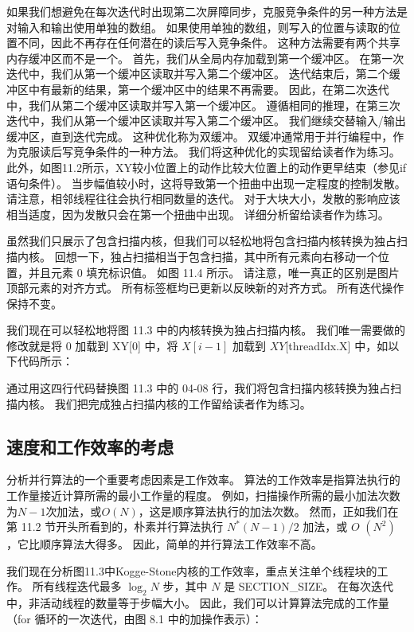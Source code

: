 如果我们想避免在每次迭代时出现第二次屏障同步，克服竞争条件的另一种方法是对输入和输出使用单独的数组。 如果使用单独的数组，则写入的位置与读取的位置不同，因此不再存在任何潜在的读后写入竞争条件。 这种方法需要有两个共享内存缓冲区而不是一个。 首先，我们从全局内存加载到第一个缓冲区。 在第一次迭代中，我们从第一个缓冲区读取并写入第二个缓冲区。 迭代结束后，第二个缓冲区中有最新的结果，第一个缓冲区中的结果不再需要。 因此，在第二次迭代中，我们从第二个缓冲区读取并写入第一个缓冲区。 遵循相同的推理，在第三次迭代中，我们从第一个缓冲区读取并写入第二个缓冲区。 我们继续交替输入/输出缓冲区，直到迭代完成。 这种优化称为双缓冲。 双缓冲通常用于并行编程中，作为克服读后写竞争条件的一种方法。 我们将这种优化的实现留给读者作为练习。 此外，如图11.2所示，$\mathrm{XY}$较小位置上的动作比较大位置上的动作更早结束（参见if语句条件）。 当步幅值较小时，这将导致第一个扭曲中出现一定程度的控制发散。 请注意，相邻线程往往会执行相同数量的迭代。 对于大块大小，发散的影响应该相当适度，因为发散只会在第一个扭曲中出现。 详细分析留给读者作为练习。

虽然我们只展示了包含扫描内核，但我们可以轻松地将包含扫描内核转换为独占扫描内核。 回想一下，独占扫描相当于包含扫描，其中所有元素向右移动一个位置，并且元素 0 填充标识值。 如图 11.4 所示。 请注意，唯一真正的区别是图片顶部元素的对齐方式。 所有标签框均已更新以反映新的对齐方式。 所有迭代操作保持不变。

我们现在可以轻松地将图 11.3 中的内核转换为独占扫描内核。 我们唯一需要做的修改就是将 0 加载到 XY[0] 中，将 $X[i-1]$ 加载到 $XY[$threadIdx.X] 中，如以下代码所示：

通过用这四行代码替换图 11.3 中的 04-08 行，我们将包含扫描内核转换为独占扫描内核。 我们把完成独占扫描内核的工作留给读者作为练习。

\subsection{速度和工作效率的考虑}
分析并行算法的一个重要考虑因素是工作效率。 算法的工作效率是指算法执行的工作量接近计算所需的最小工作量的程度。 例如，扫描操作所需的最小加法次数为$N-1$次加法，或$O(N)$，这是顺序算法执行的加法次数。 然而，正如我们在第 11.2 节开头所看到的，朴素并行算法执行 $N^{*}(N-1) / 2$ 加法，或 $O$ $\left(N^{2}\right)$ ，它比顺序算法大得多。 因此，简单的并行算法工作效率不高。

我们现在分析图11.3中Kogge-Stone内核的工作效率，重点关注单个线程块的工作。 所有线程迭代最多 $\log _{2} N$ 步，其中 $N$ 是 SECTION\_SIZE。 在每次迭代中，非活动线程的数量等于步幅大小。 因此，我们可以计算算法完成的工作量（for 循环的一次迭代，由图 8.1 中的加操作表示）：

